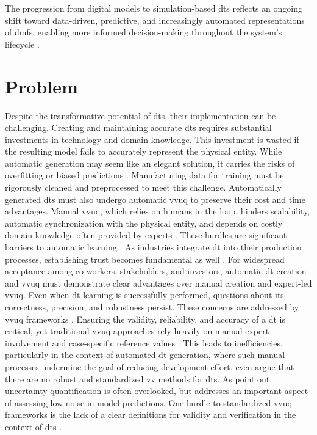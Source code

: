 The progression from digital models to simulation-based \gls{dt}s reflects an ongoing shift toward data-driven, predictive, and increasingly automated representations of \gls{dmfs}, enabling more informed decision-making throughout the system's lifecycle \autocite{boschert2016digital,lim2020state}.

\section{Problem}
\label{sec:problem}
Despite the transformative potential of \gls{dt}s, their implementation can be challenging. Creating and maintaining accurate \gls{dt}s requires substantial investments in technology and domain knowledge. This investment is wasted if the resulting model fails to accurately represent the physical entity. While automatic generation may seem like an elegant solution, it carries the risks of overfitting or biased predictions \autocite{gemanbias}. Manufacturing data for training must be rigorously cleaned and preprocessed to meet this challenge. Automatically generated \gls{dt}s must also undergo automatic \gls{vvuq} to preserve their cost and time advantages. Manual \gls{vvuq}, which relies on humans in the loop, hinders scalability, automatic synchronization with the physical entity, and depends on costly domain knowledge often provided by experts \autocite{Bitencourt2023}. These hurdles are significant barriers to automatic learning \autocite{ribeiro2016should,zhao2024data}. As industries integrate \gls{dt} into their production processes, establishing trust becomes fundamental as well \autocite{trauer2022digital,arrieta2020explainable}. For widespread acceptance among co-workers, stakeholders, and investors, automatic \gls{dt} creation and \gls{vvuq} must demonstrate clear advantages over manual creation and expert-led \gls{vvuq}. Even when \gls{dt} learning is successfully performed, questions about its correctness, precision, and robustness persist. These concerns are addressed by \gls{vvuq} frameworks \autocite{sel2025survey}. Ensuring the validity, reliability, and accuracy of a \gls{dt} is critical, yet traditional \gls{vvuq} approaches rely heavily on manual expert involvement and case-specific reference values \autocite{Bitencourt2023,hua2022validation}. This leads to inefficiencies, particularly in the context of automated \gls{dt} generation, where such manual processes undermine the goal of reducing development effort. \textcite{hua2022validation} even argue that there are no robust and standardized \gls{vv} methods for \gls{dt}s. As \textcite{sel2025survey} point out, uncertainty quantification is often overlooked, but addresses an important aspect of assessing low noise in model predictions. One hurdle to standardized \gls{vvuq} frameworks is the lack of a clear definitions for validity and verification in the context of \gls{dt}s \autocite{Bitencourt2023}.

